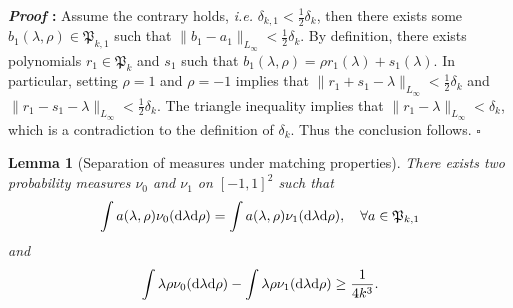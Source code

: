 \documentclass{article}
\newcommand{\dd}{\textup{d}}
\newtheorem{lemma}{Lemma}[section]
\renewenvironment{proof}{\noindent\textbf{\textit{Proof }:}}{\hfill$\square$}
\begin{document}
\begin{proof}
    Assume the contrary holds, \emph{i.e.} $\delta_{k,1}<\frac{1}{2}\delta_k$, then there exists some $b_1(\lambda,\rho)\in\mathfrak{P}_{k,1}$ such that $\|b_1-a_1\|_{L_{\infty}} < \frac{1}{2}\delta_k$. By definition, there exists polynomials $r_1\in\mathfrak{P}_k$ and $s_1$ such that $b_1(\lambda,\rho)=\rho r_1(\lambda)+s_1(\lambda)$. In particular, setting $\rho=1$ and $\rho=-1$ implies that $\|r_1+s_1-\lambda\|_{L_{\infty}}<\frac{1}{2}\delta_k$ and $\|r_1-s_1-\lambda\|_{L_{\infty}}<\frac{1}{2}\delta_k$. The triangle inequality implies that $\|r_1-\lambda\|_{L_{\infty}}<\delta_k$, which is a contradiction to the definition of $\delta_k$. Thus the conclusion follows.
\end{proof}

\begin{lemma}[Separation of measures under matching properties]
    \label{lemma:moment-matching}
    There exists two probability measures $\nu_0$ and $\nu_1$ on $[-1,1]^2$ such that
    \begin{equation}
        \label{eq:lemma-moment-matching}
        \int a(\lambda,\rho)\nu_0(\dd \lambda\dd\rho) = \int a(\lambda,\rho)\nu_1(\dd \lambda\dd\rho),\quad \forall a\in\mathfrak{P}_{k,1}
    \end{equation}
    and
    \begin{equation}
        \label{eq:lemma-moment-gap}
        \int \lambda\rho \nu_0(\dd \lambda\dd\rho) - \int \lambda\rho \nu_1(\dd \lambda\dd\rho) \geq \frac{1}{4k^3}.
    \end{equation}
\end{lemma}
\end{document}
